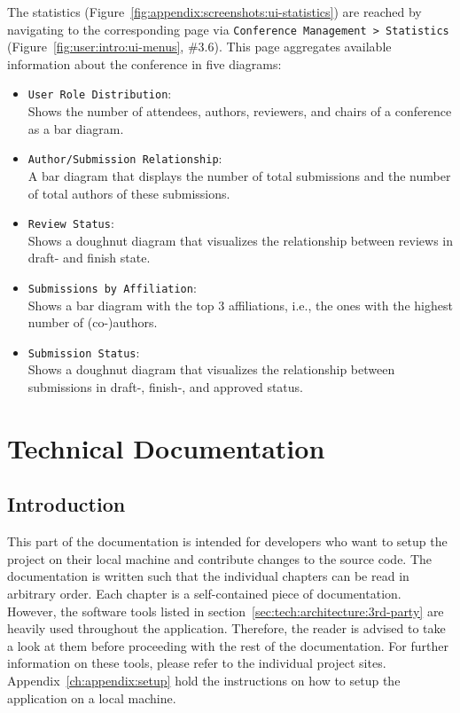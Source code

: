 \documentclass[nochapterpage,nopartpage,noheadingspace,numbersubsubsec,bigchapter,colorback,accentcolor=tud9c,10pt]{tudreport}
\begin{document}
    The statistics (Figure~\ref{fig:appendix:screenshots:ui-statistics}) are reached by navigating to the corresponding page via \texttt{Conference Management > Statistics} (Figure~\ref{fig:user:intro:ui-menus}, \#3.6). This page aggregates available information about the conference in five diagrams:
        \begin{itemize}
            \setlength\itemsep{0em}
            \item \texttt{User Role Distribution}:\\
            Shows the number of attendees, authors, reviewers, and chairs of a conference as a bar diagram.
            \item \texttt{Author/Submission Relationship}:\\
            A bar diagram that displays the number of total submissions and the number of total authors of these submissions.
            \item \texttt{Review Status}:\\
            Shows a doughnut diagram that visualizes the relationship between reviews in draft- and finish state.
            \item \texttt{Submissions by Affiliation}:\\
            Shows a bar diagram with the top 3 affiliations, i.e., the ones with the highest number of (co-)authors.
            \item \texttt{Submission Status}:\\
            Shows a doughnut diagram that visualizes the relationship between submissions in draft-, finish-, and approved status.
        \end{itemize}

\part{Technical Documentation}
\label{part:tech}

  \chapter{Introduction}
  \label{ch:tech:intro}

    This part of the documentation is intended for developers who want to setup the project on their local machine and contribute changes to the source code. The documentation is written such that the individual chapters can be read in arbitrary order. Each chapter is a self-contained piece of documentation. However, the software tools listed in section~\ref{sec:tech:architecture:3rd-party} are heavily used throughout the application. Therefore, the reader is advised to take a look at them before proceeding with the rest of the documentation. For further information on these tools, please refer to the individual project sites. Appendix~\ref{ch:appendix:setup} hold the instructions on how to setup the application on a local machine.
\end{document}
